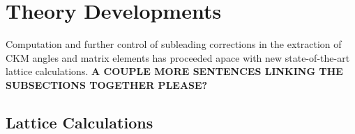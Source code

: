 %
%
%
%
%
%
%
%
%
%
\section{Theory Developments}
\label{sec:theory}
Computation and further control of subleading corrections in the extraction of CKM angles and matrix elements  has proceeded apace with new state-of-the-art lattice calculations.
\textbf{A COUPLE MORE SENTENCES LINKING THE SUBSECTIONS TOGETHER PLEASE?}

\subsection{Lattice Calculations}

